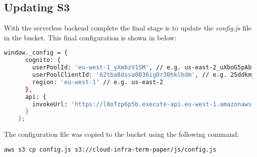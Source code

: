   \subsection{Updating S3}
  With the serverless backend complete the final stage is to update the \textit{config.js} file in the bucket. This final configuration is shown in below:
  
  \noindent\begin{minipage}{\textwidth}
    \begin{lstlisting}[caption={Client Side Scripting config.js},label=confid-js,language=bash]
    window._config = {
      cognito: {
        userPoolId: 'eu-west-1_yXmbzV1SM', // e.g. us-east-2_uXboG5pAb
        userPoolClientId: '62tba8dssa0036ig0r30hklbdm', // e.g. 25ddkmj4v6hfsfvruhpfi7n4hv
        region: 'eu-west-1' // e.g. us-east-2
      },
      api: {
        invokeUrl: 'https://l8ofzp6p5b.execute-api.eu-west-1.amazonaws.com/prod' // e.g. https://rc7nyt4tql.execute-api.us-west-2.amazonaws.com/prod',
      }
    };
    \end{lstlisting}
  \end{minipage}
  
  \noindent The configuration file was copied to the bucket using the following command:
  
  \noindent\begin{minipage}{\textwidth}
    \begin{lstlisting}[caption={Copy config.js to bucket},label=copy-confid-js,language=bash]
    aws s3 cp config.js s3://cloud-infra-term-paper/js/config.js
    \end{lstlisting}
  \end{minipage}
    
